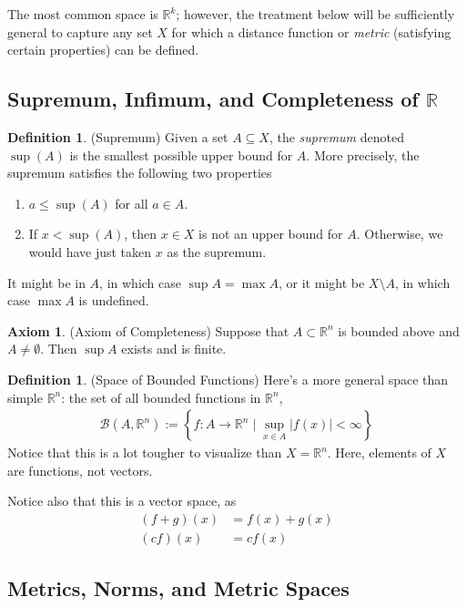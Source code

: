 \documentclass[12pt]{article}
\numberwithin{equation}{section} %
\theoremstyle{plain}
\theoremstyle{definition}
\newtheorem{ax}[thm]{Axiom}
\newtheorem{defn}[thm]{Definition}
\theoremstyle{remark}
\newcommand{\R}{\mathbb{R}}
\begin{document}
The most common space is $\R^k$; however, the treatment below
will be sufficiently general to capture any set $X$ for which a distance
function or \emph{metric} (satisfying certain properties) can be
defined.

\subsection{Supremum, Infimum, and Completeness of $\R$}


\begin{defn}{(Supremum)}
\label{defn:supdef1}
Given a set $A\subseteq X$, the \emph{supremum} denoted $\sup(A)$ is the
smallest possible upper bound for $A$.
More precisely, the supremum satisfies the following two properties
\begin{enumerate}
  \item $a\leq \sup(A)$ for all $a\in A$.
  \item If $x<\sup(A)$, then $x\in X$ is not an upper bound for $A$.
    Otherwise, we would have just taken $x$ as the supremum.
\end{enumerate}
It might be in $A$, in which case $\sup A = \max A$, or it might be
$X\setminus A$, in which case $\max A$ is undefined.
\end{defn}

\begin{ax}{(Axiom of Completeness)}
\label{ax:completeness}
Suppose that $A\subset \R^n$ is bounded above and $A\neq
\emptyset$. Then $\sup A$ exists and is finite.
\end{ax}

\begin{defn}{(Space of Bounded Functions)}
Here's a more general space than simple $\R^n$: the set of all
bounded functions in $\R^n$,
\begin{align*}
  \mathscr{B}(A,\R^n)
  :=
  \left\{
    f:A\rightarrow \R^n \; \big| \; \sup_{x\in A} |f(x)|<\infty
  \right\}
\end{align*}
Notice that this is a lot tougher to visualize than $X=\R^n$.
Here, elements of $X$ are functions, not vectors.

Notice also that this is a vector space, as
\begin{align*}
  (f+g)(x) &= f(x) + g(x)\\
  (cf)(x) &= cf(x)
\end{align*}
\end{defn}



\clearpage
\subsection{Metrics, Norms, and Metric Spaces}
\end{document}
